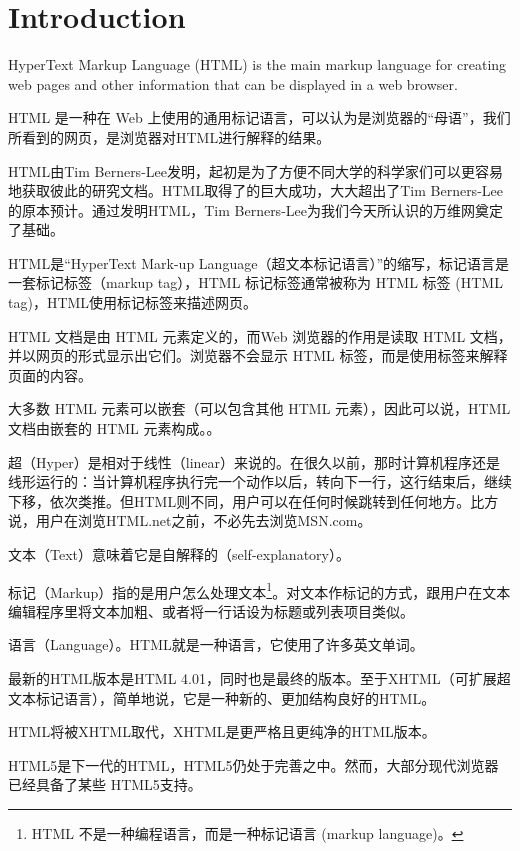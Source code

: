 \part{Introduction}

HyperText Markup Language (HTML) is the main markup language for creating web pages and other information that can be displayed in a web browser.

HTML 是一种在 Web 上使用的通用标记语言，可以认为是浏览器的“母语”，我们所看到的网页，是浏览器对HTML进行解释的结果。

HTML由Tim Berners-Lee发明，起初是为了方便不同大学的科学家们可以更容易地获取彼此的研究文档。HTML取得了的巨大成功，大大超出了Tim Berners-Lee的原本预计。通过发明HTML，Tim Berners-Lee为我们今天所认识的万维网奠定了基础。

HTML是“HyperText Mark-up Language（超文本标记语言）”的缩写，标记语言是一套标记标签（markup tag），HTML 标记标签通常被称为 HTML 标签 (HTML tag)，HTML使用标记标签来描述网页。

HTML 文档是由 HTML 元素定义的，而Web 浏览器的作用是读取 HTML 文档，并以网页的形式显示出它们。浏览器不会显示 HTML 标签，而是使用标签来解释页面的内容。

大多数 HTML 元素可以嵌套（可以包含其他 HTML 元素），因此可以说，HTML 文档由嵌套的 HTML 元素构成。。




\begin{compactitem}
\item 超（Hyper）是相对于线性（linear）来说的。在很久以前，那时计算机程序还是线形运行的：当计算机程序执行完一个动作以后，转向下一行，这行结束后，继续下移，依次类推。但HTML则不同，用户可以在任何时候跳转到任何地方。比方说，用户在浏览HTML.net之前，不必先去浏览MSN.com。
\item 文本（Text）意味着它是自解释的（self-explanatory）。
\item 标记（Markup）指的是用户怎么处理文本\footnote{HTML 不是一种编程语言，而是一种标记语言 (markup language)。}。对文本作标记的方式，跟用户在文本编辑程序里将文本加粗、或者将一行话设为标题或列表项目类似。
\item 语言（Language）。HTML就是一种语言，它使用了许多英文单词。
\end{compactitem}

最新的HTML版本是HTML 4.01，同时也是最终的版本。至于XHTML（可扩展超文本标记语言），简单地说，它是一种新的、更加结构良好的HTML。

HTML将被XHTML取代，XHTML是更严格且更纯净的HTML版本。

HTML5是下一代的HTML，HTML5仍处于完善之中。然而，大部分现代浏览器已经具备了某些 HTML5支持。


